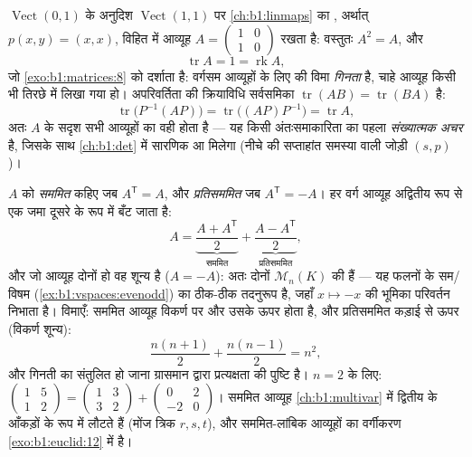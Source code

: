 \begin{example}[अनुरेख काम पर]
\label{ex:b1:matrices:tracework}
$\operatorname{Vect}(0,1)$ के अनुदिश $\operatorname{Vect}(1,1)$ पर
\cref{ch:b1:linmaps} का , अर्थात् $p(x, y) = (x, x)$, विहित  में
आव्यूह $A = \begin{pmatrix} 1 & 0\\ 1 & 0\end{pmatrix}$ रखता है: वस्तुतः
$A^2 = A$, और
\[
\operatorname{tr} A = 1 = \operatorname{rk} A ,
\]
जो \cref{exo:b1:matrices:8} को दर्शाता है: वर्गसम आव्यूहों के लिए 
 की विमा \emph{गिनता} है, चाहे आव्यूह किसी भी तिरछे  में लिखा
गया हो। अपरिवर्तिता की क्रियाविधि सर्वसमिका $\operatorname{tr}(AB) =
\operatorname{tr}(BA)$ है:
\[
\operatorname{tr}\bigl(P^{-1}(AP)\bigr) =
\operatorname{tr}\bigl((AP)P^{-1}\bigr) = \operatorname{tr} A ,
\]
अतः $A$ के सदृश सभी आव्यूहों का  वही होता है --- यह किसी अंतःसमाकारिता
का पहला \emph{संख्यात्मक अचर} है, जिसके साथ \cref{ch:b1:det} में सारणिक आ
मिलेगा (नीचे की सप्ताहांत समस्या वाली जोड़ी $(s, p)$)।
\end{example}

\begin{example}
\label{ex:b1:matrices:symsplit}
$A$ को \emph{सममित} कहिए जब $A^{\mathsf T} = A$, और \emph{प्रतिसममित} जब
$A^{\mathsf T} = -A$। हर वर्ग आव्यूह अद्वितीय रूप से एक जमा दूसरे के रूप में
बँट जाता है:
\[
A = \underbrace{\frac{A + A^{\mathsf T}}{2}}_{\text{सममित}}
+ \underbrace{\frac{A - A^{\mathsf T}}{2}}_{\text{प्रतिसममित}},
\]
और जो आव्यूह दोनों हो वह शून्य है ($A = -A$): अतः दोनों 
$\mathcal{M}_n(K)$ की  हैं --- यह फलनों के सम/विषम 
(\cref{ex:b1:vspaces:evenodd}) का ठीक-ठीक तदनुरूप है, जहाँ $x \mapsto -x$ की
भूमिका परिवर्तन निभाता है। विमाएँ: सममित आव्यूह विकर्ण पर और उसके ऊपर
 होता है, और प्रतिसममित कड़ाई से ऊपर (विकर्ण शून्य):
\[
\frac{n(n+1)}{2} + \frac{n(n-1)}{2} = n^2 ,
\]
और गिनती का संतुलित हो जाना ग्रासमान द्वारा प्रत्यक्षता की पुष्टि है। $n =
2$ के लिए: $\begin{pmatrix} 1 & 5\\ 1 & 2\end{pmatrix} = \begin{pmatrix} 1 &
3\\ 3 & 2\end{pmatrix} + \begin{pmatrix} 0 & 2\\ -2 & 0\end{pmatrix}$। सममित
आव्यूह \cref{ch:b1:multivar} में द्वितीय  के आँकड़ों के रूप में लौटते
हैं (मोंज त्रिक $r, s, t$), और सममित-लांबिक आव्यूहों का वर्गीकरण
\cref{exo:b1:euclid:12} में है।
\end{example}

